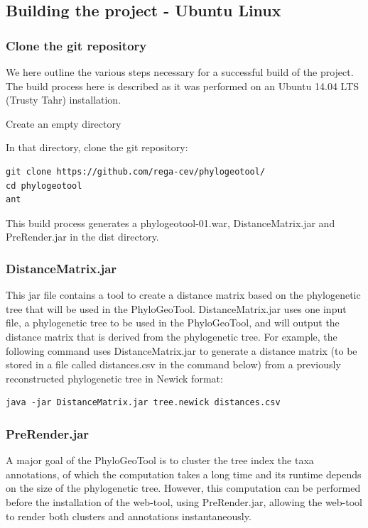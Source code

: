 \documentclass[a4paper, 11pt]{article} %
\begin{document}
\subsection{Building the project - Ubuntu Linux}

\subsubsection{Clone the git repository}

We here outline the various steps necessary for a successful build of the project.
The build process here is described as it was performed on an Ubuntu 14.04 LTS (Trusty Tahr) installation.
\begin{itemize}
\item Create an empty directory
\item {In that directory, clone the git repository: 
\begin{verbatim}
git clone https://github.com/rega-cev/phylogeotool/
cd phylogeotool
ant
\end{verbatim}
\item This build process generates a phylogeotool-01.war, DistanceMatrix.jar and PreRender.jar in the dist directory.
}
\end{itemize}

\subsubsection{DistanceMatrix.jar}
This jar file contains a tool to create a distance matrix based on the phylogenetic tree that will be used in the PhyloGeoTool.
DistanceMatrix.jar uses one input file, a phylogenetic tree to be used in the PhyloGeoTool, and will output the distance matrix that is derived from the phylogenetic tree. %
For example, the following command uses DistanceMatrix.jar to generate a distance matrix (to be stored in a file called distances.csv in the command below) from a previously reconstructed phylogenetic tree in Newick format: 
\begin{verbatim}
java -jar DistanceMatrix.jar tree.newick distances.csv
\end{verbatim}

\subsubsection{PreRender.jar}
A major goal of the PhyloGeoTool is to cluster the tree index the taxa annotations, of which the computation takes a long time and its runtime depends on the size of the phylogenetic tree. 
However, this computation can be performed before the installation of the web-tool, using PreRender.jar, allowing the web-tool to render both clusters and annotations instantaneously.
\end{document}
